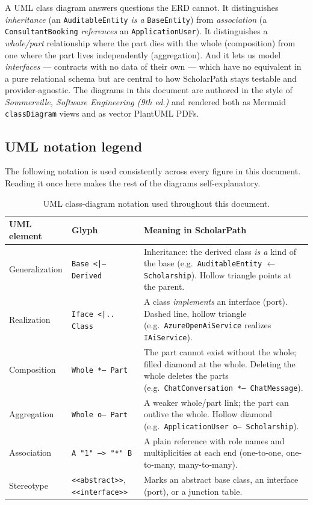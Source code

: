 \documentclass[11pt,a4paper]{article}
\begin{document}
A UML class diagram answers questions the ERD cannot. It distinguishes
\emph{inheritance} (an \texttt{AuditableEntity} \emph{is a} \texttt{BaseEntity})
from \emph{association} (a \texttt{ConsultantBooking} \emph{references} an
\texttt{ApplicationUser}). It distinguishes a \emph{whole/part} relationship
where the part dies with the whole (composition) from one where the part lives
independently (aggregation). And it lets us model \emph{interfaces} ---
contracts with no data of their own --- which have no equivalent in a pure
relational schema but are central to how ScholarPath stays testable and
provider-agnostic. The diagrams in this document are authored in the style of
\emph{Sommerville, Software Engineering (9th ed.)} and rendered both as Mermaid
\texttt{classDiagram} views and as vector PlantUML PDFs.

\subsection{UML notation legend}

The following notation is used consistently across every figure in this
document. Reading it once here makes the rest of the diagrams self-explanatory.

\begin{table}[H]\centering
\caption{UML class-diagram notation used throughout this document.}
\label{tab:legend}
\small
\begin{tabular}{@{}l l p{8.2cm}@{}}
\toprule
\textbf{UML element} & \textbf{Glyph} & \textbf{Meaning in ScholarPath} \\
\midrule
Generalization & \texttt{Base <|-- Derived} & Inheritance: the derived class
\emph{is a} kind of the base (e.g.\ \texttt{AuditableEntity} $\leftarrow$
\texttt{Scholarship}). Hollow triangle points at the parent. \\
Realization & \texttt{Iface <|.. Class} & A class \emph{implements} an
interface (port). Dashed line, hollow triangle (e.g.\
\texttt{AzureOpenAiService} realizes \texttt{IAiService}). \\
Composition & \texttt{Whole *-- Part} & The part cannot exist without the
whole; filled diamond at the whole. Deleting the whole deletes the parts
(e.g.\ \texttt{ChatConversation *-- ChatMessage}). \\
Aggregation & \texttt{Whole o-- Part} & A weaker whole/part link; the part can
outlive the whole. Hollow diamond (e.g.\
\texttt{ApplicationUser o-- Scholarship}). \\
Association & \texttt{A "1" --> "*" B} & A plain reference with role names and
multiplicities at each end (one-to-one, one-to-many, many-to-many). \\
Stereotype & \texttt{<<abstract>>}, \texttt{<<interface>>} & Marks an abstract
base class, an interface (port), or a junction table. \\
\bottomrule
\end{tabular}
\end{table}
\end{document}
